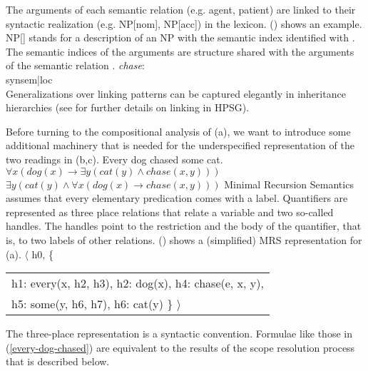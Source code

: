 \begin{exe}
\begin{xlist}[iv.]
\begin{exe}
\begin{xlist}[iv.]
\begin{exe}
\begin{xlist}[iv.]
The arguments of each semantic relation (e.g. agent, patient) are linked to their syntactic realization (e.g. NP[nom], NP[acc]) in the lexicon. () shows an
example. NP[] stands for a description of an NP with the semantic index identified with . The semantic indices of the arguments are structure shared with the arguments of the semantic relation .
\ea
\label{le-chase}
\emph{chase}:\\
\onems
{ synsem|loc \\
}
\z
Generalizations over linking patterns can be captured elegantly in inheritance hierarchies (see
 for further details on linking in HPSG).


Before turning to the compositional analysis of (a), we want to introduce some additional machinery that is needed for the underspecified representation of the two readings in (b,c).
\eal
\label{every-dog-chased}
\ex\label{ex-every-dog-chased}
Every dog chased some cat.
\ex $\forall x (dog(x) \to \exists y (cat(y) \wedge chase(x,y)))$
\ex $\exists y (cat(y) \wedge\forall x  (dog(x) \to chase(x,y)))$
\zl
Minimal Recursion Semantics assumes that every elementary predication comes with a
label. Quantifiers are represented as three place relations that relate a variable and two so-called handles. The handles point to the restriction and the body of the quantifier, that is, to two labels of other relations. () shows a (simplified) MRS representation for (a).
\ea
$\langle$ h0, \{ \begin{tabular}[t]{@{}l@{}}
                  h1: every(x, h2, h3), h2: dog(x), h4: chase(e, x, y), \\
                  h5: some(y, h6, h7), h6:  cat(y) \} $\rangle$\\
                  \end{tabular}
\z
The three-place representation is a syntactic convention. Formulae like those in
(\ref{every-dog-chased}) are equivalent to the results of the scope resolution process that is described below.


\end{xlist}
\end{exe}
\end{xlist}
\end{exe}
\end{xlist}
\end{exe}
